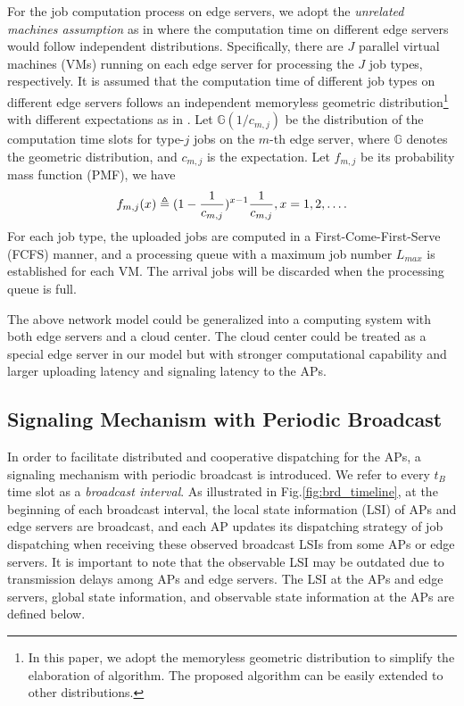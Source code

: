 For the job computation process on edge servers, we adopt the \emph{unrelated machines assumption} as in \cite{tan-online} where the computation time on different edge servers would follow independent distributions.
Specifically, there are $J$ parallel virtual machines (VMs) running on each edge server for processing the $J$ job types, respectively.
It is assumed that the computation time of different job types on different edge servers follows an independent memoryless geometric distribution\footnote{In this paper, we adopt the memoryless geometric distribution to simplify the elaboration of algorithm. The proposed algorithm can be easily extended to other distributions.}
with different expectations as in \cite{TOWC18-HuangKb}.
Let $\mathbb{G}(1/c_{m,j})$ be the distribution of the computation time slots for type-$j$ jobs on the $m$-th edge server, where $\mathbb{G}$ denotes the geometric distribution, and $c_{m,j}$ is the expectation.
Let $f_{m,j}$ be its probability mass function (PMF), we have
\begin{align}
    f_{m,j}(x) \triangleq (1-\frac{1}{c_{m,j}})^{x-1} \frac{1}{c_{m,j}}, x=1,2,\dots.
\end{align}
For each job type, the uploaded jobs are computed in a First-Come-First-Serve (FCFS) manner, and a processing queue with a maximum job number $L_{max}$ is established for each VM.
The arrival jobs will be discarded when the processing queue is full.

\begin{remark}%
    The above network model could be generalized into a computing system with both edge servers and a cloud center.
    The cloud center could be treated as a special edge server in our model but with stronger computational capability and larger uploading latency and signaling latency to the APs.
\end{remark}

\subsection{Signaling Mechanism with Periodic Broadcast}
\label{subsec:broadcast}
In order to facilitate distributed and cooperative dispatching for the APs, a signaling mechanism with periodic broadcast is introduced.
We refer to every $t_B$ time slot as a \emph{broadcast interval}.
As illustrated in Fig.\ref{fig:brd_timeline}, at the beginning of each broadcast interval, the local state information (LSI) of APs and edge servers are broadcast, and each AP updates its dispatching strategy of job dispatching when receiving these observed broadcast LSIs from some APs or edge servers.
It is important to note that the observable LSI may be outdated due to transmission delays among APs and edge servers.
The LSI at the APs and edge servers, global state information, and observable state information at the APs are defined below.

